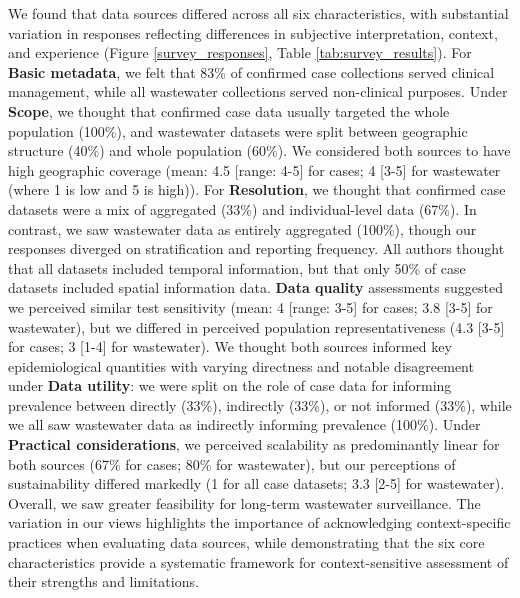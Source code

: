 \documentclass{article}
\begin{document}
We found that data sources differed across all six characteristics, with substantial variation in responses reflecting differences in subjective interpretation, context, and experience (Figure \ref{survey_responses}, Table \ref{tab:survey_results}). For \textbf{Basic metadata}, we felt that 83\% of confirmed case collections served clinical management, while all wastewater collections served non-clinical purposes. Under \textbf{Scope}, we thought that confirmed case data usually targeted the whole population (100\%),  and wastewater datasets were split between geographic structure (40\%) and whole population (60\%). We considered both sources to have high geographic coverage (mean: 4.5 [range: 4-5] for cases; 4 [3-5] for wastewater (where 1 is low and 5 is high)). For \textbf{Resolution}, we thought that confirmed case datasets were a mix of aggregated (33\%) and individual-level data (67\%). In contrast, we saw wastewater data as entirely aggregated (100\%), though our responses diverged on stratification and reporting frequency. All authors thought that all datasets included temporal information, but that only 50\% of case datasets included spatial information data. \textbf{Data quality} assessments suggested we perceived similar test sensitivity (mean: 4 [range: 3-5] for cases; 3.8 [3-5] for wastewater), but we differed in perceived population representativeness (4.3 [3-5] for cases; 3 [1-4] for wastewater). We thought both sources informed key epidemiological quantities with varying directness and notable disagreement under \textbf{Data utility}: we were split on the role of case data for informing prevalence between directly (33\%), indirectly (33\%), or not informed (33\%), while we all saw wastewater data as indirectly informing prevalence (100\%). Under \textbf{Practical considerations}, we perceived scalability as predominantly linear for both sources (67\% for cases; 80\% for wastewater), but our perceptions of sustainability differed markedly (1 for all case datasets; 3.3 [2-5] for wastewater). Overall, we saw greater feasibility for long-term wastewater surveillance. The variation in our views highlights the importance of acknowledging context-specific practices when evaluating data sources, while demonstrating that the six core characteristics provide a systematic framework for context-sensitive assessment of their strengths and limitations.
\end{document}
